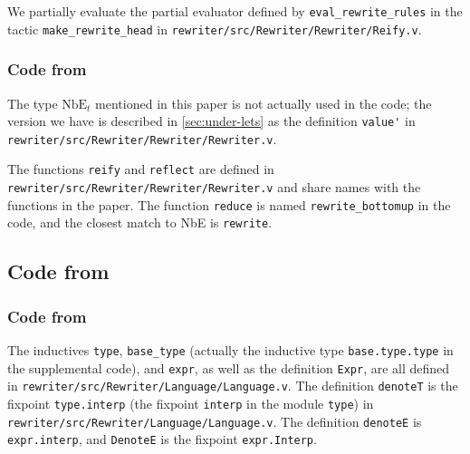 \begin{subappendices}
We partially evaluate the partial evaluator defined by \verb|eval_rewrite_rules| in the \Ltac{} tactic \verb|make_rewrite_head| in \texttt{rewriter/src/Rewriter/Rewriter/Reify.v}.

\subsubsection{Code from }

The type $\text{NbE}_t$ mentioned in this paper is not actually used in the code; the version we have is described in \autoref{sec:under-lets} as the definition \verb|value'| in \texttt{rewriter/src/Rewriter/Rewriter/Rewriter.v}.

The functions \verb|reify| and \verb|reflect| are defined in \texttt{rewriter/src/Rewriter/Rewriter/Rewriter.v} and share names with the functions in the paper.
The function \texttt{reduce} is named \verb|rewrite_bottomup| in the code, and the closest match to NbE is \verb|rewrite|.

\subsection{Code from }

\subsubsection{Code from }

The inductives \verb|type|, \verb|base_type| (actually the inductive type \verb|base.type.type| in the supplemental code), and \verb|expr|, as well as the definition \verb|Expr|, are all defined in \texttt{rewriter/src/Rewriter/Language/Language.v}.
The definition \verb|denoteT| is the fixpoint \verb|type.interp| (the fixpoint \verb|interp| in the module \verb|type|) in \texttt{rewriter/src/Rewriter/Language/Language.v}.
The definition \verb|denoteE| is \verb|expr.interp|, and \verb|DenoteE| is the fixpoint \verb|expr.Interp|.


\end{subappendices}
